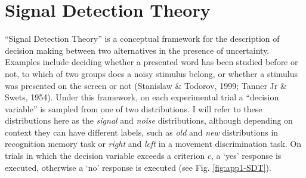 \documentclass[12pt,twoside]{reedthesis}
\begin{document}
\appendix

\hypertarget{app1:SDT}{%
\chapter{Signal Detection Theory}\label{app1:SDT}}

``Signal Detection Theory'' is a conceptual framework for the description of decision making between two alternatives in the presence of uncertainty. Examples include deciding whether a presented word has been studied before or not, to which of two groups does a noisy stimulus belong, or whether a stimulus was presented on the screen or not (Stanislaw \& Todorov, 1999; Tanner Jr \& Swets, 1954). Under this framework, on each experimental trial a ``decision variable'' is sampled from one of two distributions. I will refer to these distributions here as the \emph{signal} and \emph{noise} distributions, although depending on context they can have different labels, such as \emph{old} and \emph{new} distributions in recognition memory task or \emph{right} and \emph{left} in a movement discrimination task. On trials in which the decision variable exceeds a criterion \(c\), a `yes' response is executed, otherwise a `no' response is executed (see Fig. \ref{fig:app1-SDT}).
\end{document}
